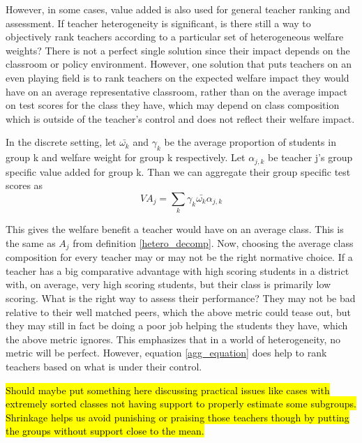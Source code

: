 \documentclass{article}
\theoremstyle{definition}
\theoremstyle{definition}
\theoremstyle{definition}
\theoremstyle{definition}
\begin{document}
        However, in some cases,  value added is also used for general teacher ranking and assessment. If teacher heterogeneity is significant, is there still a way to objectively rank teachers according to a particular set of heterogeneous welfare weights? There is not a perfect single solution since their impact depends on the classroom or policy environment. However, one solution that puts teachers on an even playing field is to rank teachers on the expected welfare impact they would have on an average representative classroom, rather than on the average impact on test scores for the class they have, which may depend on class composition which is outside of the teacher's control and does not reflect their welfare impact.
        
        
        In the discrete setting, let $\bar{\omega_k}$ and $\gamma_k$ be the average proportion of students in group k and welfare weight for group k respectively. Let $\alpha_{j,k}$ be teacher j's group specific value added for group k. Than we can aggregate their group specific test scores as 
        \begin{equation}
        \label{agg_equation}
            VA_j = \sum_k \gamma_k \bar{\omega_k} \alpha_{j,k}
        \end{equation}
        
        This gives the welfare benefit a teacher would have on an average class. This is the same as $A_j$ from definition \ref{hetero_decomp}. Now, choosing the average class composition for every teacher may or may not be the right normative choice. If a teacher has a big comparative advantage with high scoring students in a district with, on average, very high scoring students, but their class is primarily low scoring. What is the right way to assess their performance? They may not be bad relative to their well matched peers, which the above metric could tease out, but they may still in fact be doing a poor job helping the students they have, which the above metric ignores. This emphasizes that in a world of heterogeneity, no metric will be perfect. However, equation \ref{agg_equation} does help to rank teachers based on what is under their control. 
        
        \hl{Should maybe put something here discussing practical issues like cases with extremely sorted classes not having support to properly estimate some subgroups. Shrinkage helps us avoid punishing or praising those teachers though by putting the groups without support close to the mean.}
\end{document}
